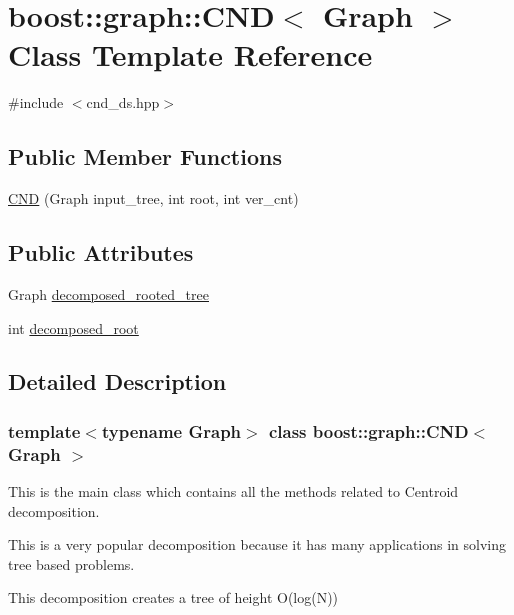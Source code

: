 \hypertarget{classboost_1_1graph_1_1CND}{}\section{boost\+:\+:graph\+:\+:C\+ND$<$ Graph $>$ Class Template Reference}
\label{classboost_1_1graph_1_1CND}


{\ttfamily \#include $<$cnd\+\_\+ds.\+hpp$>$}

\subsection*{Public Member Functions}
\begin{DoxyCompactItemize}
\item 
\hyperlink{classboost_1_1graph_1_1CND_a57be1dfcac9859d683aeb836dc55e49e}{C\+ND} (Graph input\+\_\+tree, int root, int ver\+\_\+cnt)
\end{DoxyCompactItemize}
\subsection*{Public Attributes}
\begin{DoxyCompactItemize}
\item 
Graph \hyperlink{classboost_1_1graph_1_1CND_a21a1bc72301bab671c59c1e290b03e36}{decomposed\+\_\+rooted\+\_\+tree}
\item 
int \hyperlink{classboost_1_1graph_1_1CND_a366ea26abffc24a94b9c9e4a8bdf05be}{decomposed\+\_\+root}
\end{DoxyCompactItemize}


\subsection{Detailed Description}
\subsubsection*{template$<$typename Graph$>$\newline
class boost\+::graph\+::\+C\+N\+D$<$ Graph $>$}


\begin{DoxyItemize}
\item This is the main class which contains all the methods related to Centroid decomposition. 
\item This is a very popular decomposition because it has many applications in solving tree based problems. 
\item This decomposition creates a tree of height O(log(\+N)) 
\end{DoxyItemize}

